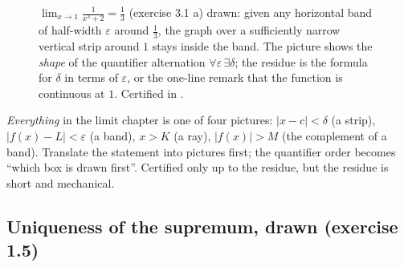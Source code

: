 \begin{figure}[H]
\centering
{}
\caption{$\lim_{x\to1}\frac{1}{x^{3}+2}=\frac13$ (exercise 3.1 a) drawn: given any
horizontal band of half-width $\varepsilon$ around $\frac13$, the graph over a
sufficiently narrow vertical strip around $1$ stays inside the band. The picture shows
the \emph{shape} of the quantifier alternation $\forall\varepsilon\,\exists\delta$; the
residue is the formula for $\delta$ in terms of $\varepsilon$, or the one-line remark
that the function is continuous at $1$. Certified in .}
\label{fig:epsdelta}
\end{figure}

\begin{recipe}
\emph{Everything} in the limit chapter is one of four pictures:
$|x-c|<\delta$ (a strip), $|f(x)-L|<\varepsilon$ (a band), $x>K$ (a ray), $|f(x)|>M$
(the complement of a band). Translate the statement into pictures first; the quantifier
order becomes ``which box is drawn first''. Certified only up to the residue, but the
residue is short and mechanical.
\end{recipe}

\subsection{Uniqueness of the supremum, drawn (exercise 1.5)}

